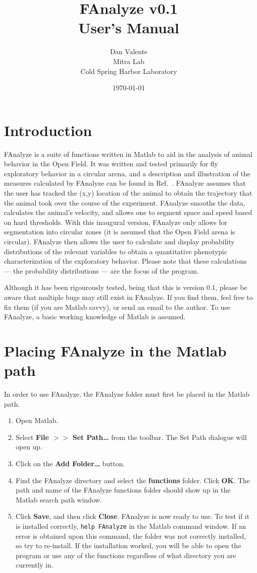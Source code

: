 \documentclass[letterpaper, 11pt]{article}
\title{FAnalyze v0.1 \\User's Manual}
\author{Dan Valente\\\small{Mitra Lab}\\\small{Cold Spring Harbor Laboratory}}
\date{\today}
\begin{document}
\maketitle

\section{Introduction}

FAnalyze is a suite of functions written in Matlab to aid in the analysis of animal behavior in the
Open Field.   It was written and tested primarily for fly exploratory behavior in a circular arena,
and a description and illustration of the measures calculated by FAnalyze can be found in Ref.\
\cite{valente1}.  FAnalyze assumes that the user has tracked the (x,y) location of the animal to
obtain the trajectory that the animal took over the course of the experiment.  FAnalyze smooths the
data, calculates the animal's velocity, and allows one to segment space and speed based on hard
thresholds.  With this inaugural version, FAnalyze only allows for segmentation into circular zones
(it is assumed that the Open Field arena is circular). FAnalyze then allows the user to calculate
and display probability distributions of the relevant variables to obtain a quantitative phenotypic
characterization of the exploratory behavior.  Please note that these calculations --- the
probability distributions --- are the focus of the program.

Although it has been rigourously tested, being that this is version 0.1, please be aware that
multiple bugs may still exist in FAnalyze.  If you find them, feel free to fix them (if you are
Matlab savvy), or send an email to the author.  To use FAnalyze, a basic working knowledge of
Matlab is assumed.


\section{Placing FAnalyze in the Matlab path}
In order to use FAnalyze, the FAnalyze folder must first be placed in the Matlab path.

\begin{enumerate}
\item Open Matlab.
\item Select \textbf{File $>>$ Set Path\ldots} from the toolbar.  The Set Path dialogue will open up.
\item Click on the \textbf{Add Folder\ldots} button.
\item Find the FAnalyze directory and select the \textbf{functions} folder. Click \textbf{OK}.  The path and name of the
FAnalyze functions folder should show up in the Matlab search path window.
\item Click \textbf{Save}, and then click \textbf{Close}. FAnalyze is now ready to use.  To test if
it is installed correctly, \texttt{help FAnalyze} in the Matlab command window. If an error is
obtained upon this command, the folder was not correctly installed, so try to re-install. If the
installation worked, you will be able to open the program or use any of the functions regardless of
what directory you are currently in.
\end{enumerate}
\end{document}
